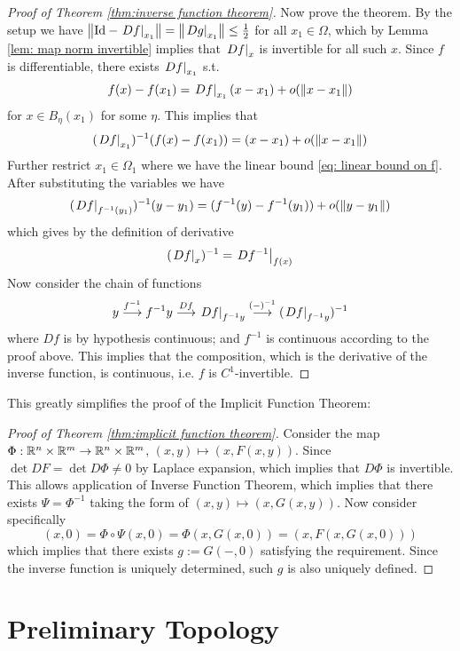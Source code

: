 \documentclass{article}
\begin{document}
\begin{proof}[Proof of Theorem \ref{thm:inverse function theorem}]
    Now prove the theorem. By the setup we have $\left\|\mathrm{Id} - \left.Df\right|_{x_1}\right\| = \left\|\left.Dg\right|_{x_1}\right\| \leq \frac{1}{2}$ for all $x_1 \in \Omega$, which by Lemma \ref{lem: map norm invertible} implies that $\left.Df\right|_{x}$ is invertible for all such $x$. Since $f$ is differentiable, there exists $\left.Df\right|_{x_1}$ s.t. 
    \[
        f(x) - f(x_1) = \left.Df\right|_{x_1} (x - x_1) + o(\left\|x - x_1\right\|)
    \]
    for $x \in B_{\eta}(x_1)$ for some $\eta$. This implies that
    \[
        (\left.Df\right|_{x_1})^{-1}(f(x) - f(x_1)) = (x - x_1) + o(\left\|x - x_1\right\|)
    \]
    Further restrict $x_1 \in \Omega_1$ where we have the linear bound \eqref{eq: linear bound on f}. After substituting the variables we have
    \[
        (\left.Df\right|_{f^{-1}(y_1)})^{-1}(y - y_1) = (f^{-1}(y) - f^{-1}(y_1)) + o(\left\|y - y_1\right\|)
    \]
    which gives by the definition of derivative
    \[
        (\left.Df\right|_{x})^{-1} = \left.Df^{-1}\right|_{f(x)} 
    \]
    Now consider the chain of functions
    \[
        y \overset{f^{-1}}{\longrightarrow} f^{-1}y \overset{Df}{\longrightarrow} \left.Df\right|_{f^{-1}y} \overset{(-)^{-1}}{\longrightarrow} (\left.Df\right|_{f^{-1}y})^{-1}
    \]
    where $Df$ is by hypothesis continuous; and $f^{-1}$ is continuous according to the proof above. This implies that the composition, which is the derivative of the inverse function, is continuous, i.e. $f$ is $C^1$-invertible.
\end{proof}

This greatly simplifies the proof of the Implicit Function Theorem:
\begin{proof}[Proof of Theorem \ref{thm:implicit function theorem}]
    Consider the map $\Phi: \mathbb{R}^n \times \mathbb{R}^m \to \mathbb{R}^n \times \mathbb{R}^m$, $(x, y) \mapsto (x, F(x, y))$. Since $\det DF = \det D\Phi \neq 0$ by Laplace expansion, which implies that $D\Phi$ is invertible. This allows application of Inverse Function Theorem, which implies that there exists $\Psi = \Phi^{-1}$ taking the form of $(x, y) \mapsto (x, G(x, y))$. Now consider specifically
    \[
        (x, 0) = \Phi \circ \Psi(x, 0) = \Phi(x, G(x, 0)) = (x, F(x, G(x, 0)))
    \]
    which implies that there exists $g := G(-, 0)$ satisfying the requirement. Since the inverse function is uniquely determined, such $g$ is also uniquely defined.
\end{proof}

\section{Preliminary Topology}
\end{document}
